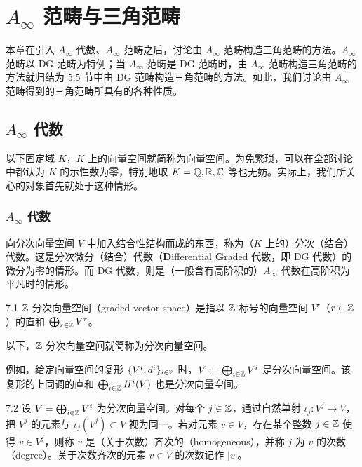 \chapter{$A_\infty$ 范畴与三角范畴}

本章在引入 $A_\infty$ 代数、$A_\infty$ 范畴之后，讨论由 $A_\infty$ 范畴构造三角范畴的方法。$A_\infty$ 范畴以 DG 范畴为特例；当 $A_\infty$ 范畴是 DG 范畴时，由 $A_\infty$ 范畴构造三角范畴的方法就归结为 5.5 节中由 DG 范畴构造三角范畴的方法。如此，我们讨论由 $A_\infty$ 范畴得到的三角范畴所具有的各种性质。

\section{$A_\infty$ 代数}

以下固定域 $K$，$K$ 上的向量空间就简称为向量空间。为免繁琐，可以在全部讨论中都认为 $K$ 的示性数为零，特别地取 $K=\mathbb{Q},\mathbb{R},\mathbb{C}$ 等也无妨。实际上，我们所关心的对象首先就处于这种情形。

\subsection{$A_\infty$ 代数}

向分次向量空间 $V$ 中加入结合性结构而成的东西，称为（$K$ 上的）分次（结合）代数。这是分次微分（结合）代数（\textbf{D}ifferential \textbf{G}raded 代数，即 DG 代数）的微分为零的情形。而 DG 代数，则是（一般含有高阶积的）$A_\infty$ 代数在高阶积为平凡时的情形。

\begin{definition}{7.1}
$\mathbb{Z}$ 分次向量空间（graded vector space）是指以 $\mathbb{Z}$ 标号的向量空间 $V^{r}$（$r\in\mathbb{Z}$）的直和 $\bigoplus_{r\in\mathbb{Z}}V^{r}$。
\end{definition}


以下，$\mathbb{Z}$ 分次向量空间就简称为分次向量空间。

例如，给定向量空间的复形 $\{V^{i},d^{i}\}_{i\in\mathbb{Z}}$ 时，$V:=\bigoplus_{i\in\mathbb{Z}}V^{i}$ 是分次向量空间。该复形的上同调的直和 $\bigoplus_{i\in\mathbb{Z}}H^{i}(V)$ 也是分次向量空间。

\begin{definition}{7.2}
设 $V=\bigoplus_{i\in\mathbb{Z}}V^{i}$ 为分次向量空间。对每个 $j\in\mathbb{Z}$，通过自然单射 $\iota_{j}\colon V^{j}\to V$，把 $V^{j}$ 的元素与 $\iota_{j}(V^{j})\subset V$ 视为同一。若对元素 $v\in V$，存在某个整数 $j\in\mathbb{Z}$ 使得 $v\in V^{j}$，则称 $v$ 是（关于次数）齐次的（homogeneous），并称 $j$ 为 $v$ 的次数（degree）。关于次数齐次的元素 $v\in V$ 的次数记作 $|v|$。
\end{definition}

